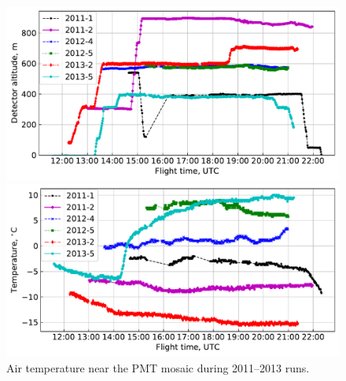 \documentclass[universe,article,submit,moreauthors,pdftex]{Definitions/mdpi}
\begin{document}
\begin{paracol}{2}
\switchcolumn

\begin{figure}[tb]    
    \begin{minipage}[t]{0.48\textwidth}
        \centering
        \includegraphics[width=\textwidth]{Telemetry_height.pdf}
        \caption{Altitude of the SPHERE-2 detector carried by the BAPA tethered balloon according to the GPS module data during 2011--2013 flights.}
        \label{fig:height}
    \end{minipage}
    \hfill
    \begin{minipage}[t]{0.48\textwidth}
        \centering
        \includegraphics[width=\textwidth]{Telemetry_tmos.pdf}
        \caption{Air temperature near the PMT mosaic during 2011--2013 runs.}
        \label{fig:temperature}
    \end{minipage}
\end{figure}


\end{paracol}
\end{document}
